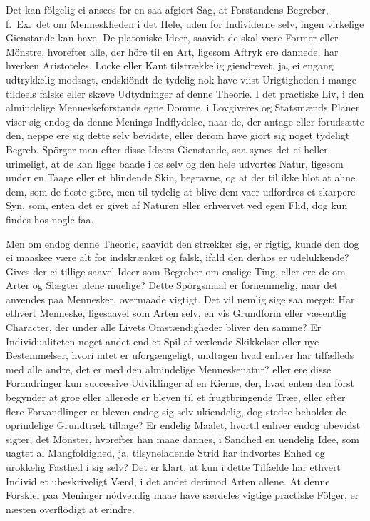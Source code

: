 \documentclass[12pt,a4paper]{article}
\newcommand{\opage}[1]{\marginnote{\footnotesize\textit{[#1]}}}
\begin{document}
Det kan fölgelig ei ansees for en saa afgiort Sag, at Forstandens
Begreber, f.~Ex.\ det om Menneskheden i det Hele, uden for Individerne
selv, ingen virkelige Gienstande kan have. De platoniske Ideer, saavidt
de skal være Former eller Mönstre, hvorefter alle, der höre til en Art,
ligesom Aftryk ere dannede, har hverken Aristoteles, Locke eller Kant
tilstrækkelig giendrevet, ja, ei engang udtrykkelig modsagt, endskiöndt de
tydelig nok have viist Urigtigheden i mange tildeels falske eller skæve
Udtydninger af denne Theorie. I det practiske Liv, i den almindelige
Menneskeforstands egne Domme, i Lovgiveres og Statsmænds Planer viser sig
endog da denne Menings Indflydelse, naar de, der antage eller forudsætte
den, neppe ere sig dette
\opage{229} selv bevidste, eller derom have giort sig noget tydeligt Begreb. Spörger
man efter disse Ideers Gienstande, saa synes det ei heller urimeligt, at
de kan ligge baade i os selv og den hele udvortes Natur, ligesom under en
Taage eller et blindende Skin, begravne, og at der til ikke blot at ahne
dem, som de fleste giöre, men til tydelig at blive dem vaer udfordres et
skarpere Syn, som, enten det er givet af Naturen eller erhvervet ved egen
Flid, dog kun findes hos nogle faa.

Men om endog denne Theorie, saavidt den strækker sig, er rigtig, kunde
den dog ei maaskee være alt for indskrænket og falsk, ifald den derhos er
udelukkende? Gives der ei tillige saavel Ideer som Begreber om enslige
Ting, eller ere de om Arter og Slægter alene muelige? Dette Spörgsmaal er
fornemmelig, naar det anvendes paa Mennesker, overmaade vigtigt. Det vil
nemlig sige saa meget: Har ethvert Menneske, ligesaavel som Arten selv, en
vis Grundform eller væsentlig Character, der under alle Livets
Omstændigheder bliver den samme? Er Individualiteten noget andet end et
Spil af vexlende Skikkelser eller nye Bestemmelser, hvori intet er
uforgængeligt, undtagen hvad enhver har tilfælleds med alle andre, det er
med den almindelige Menneskenatur? eller ere disse Forandringer kun
successive Udviklinger af en Kierne, der, hvad enten den först begynder at
groe eller allerede er bleven til et frugtbringende Træe, eller efter
flere Forvandlinger er bleven endog sig selv ukiendelig, dog stedse
beholder de oprindelige Grundtræk tilbage? Er endelig Maalet, hvortil
enhver endog ubevidst sigter, det Mönster, hvorefter han maae dannes, i
Sandhed en uendelig Idee, som uagtet al Mangfoldighed,
\opage{230} ja, tilsyneladende Strid har indvortes Enhed og urokkelig Fasthed i sig
selv? Det er klart, at kun i dette Tilfælde har ethvert Individ et
ubeskriveligt Værd, i det andet derimod Arten allene. At denne Forskiel
paa Meninger nödvendig maae have særdeles vigtige practiske Fölger, er
næsten overflödigt at erindre.
\end{document}
